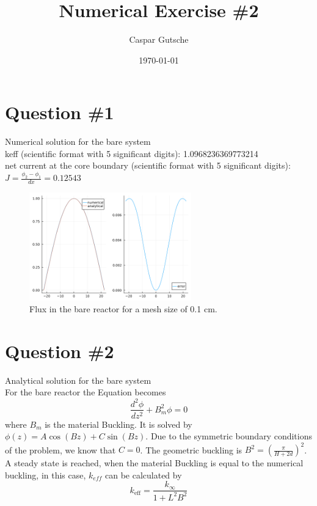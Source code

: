\documentclass[11pt,a4paper]{article}
\begin{document}
\title{Numerical Exercise \#2}
\author{Caspar Gutsche\\  %
}
\date{\today}
\maketitle



\newpage
\section{Question \#1}
Numerical solution for the bare system \\
keff (scientific format with 5 significant digits): 1.0968236369773214 \\
net current at the core boundary (scientific format with 5 significant digits): $J = \frac{\phi_{2}-\phi_{1}}{dx}= 0.12543$ \\
\begin{figure}[h]
	\includegraphics[width=7cm]{../figs/ex2/bare.png}
	\centering
	\caption{Flux in the bare reactor for a mesh size of 0.1 cm.}
\end{figure}

\section{Question \#2}
Analytical solution for the bare system\\
For the bare reactor the Equation becomes
$$
\frac{d^2 \phi}{d z^2}+B_m^2 \phi=0
$$
where $B_{m}$ is the material Buckling. 
It is solved by $\phi(z)=A \cos (B z)+C \sin (B z)$. Due to the symmetric boundary conditions of the problem, we know that $C=0$. The geometric buckling is $B^2=\left(\frac{\pi}{H+2 d}\right)^2$.
A steady state is reached, when the material Buckling is equal to the numerical buckling, in this case, $k_{eff}$ can be calculated by
$$
k_{\mathrm{eff}}=\frac{k_{\infty}}{1+L^2 B^2}
$$
\end{document}
